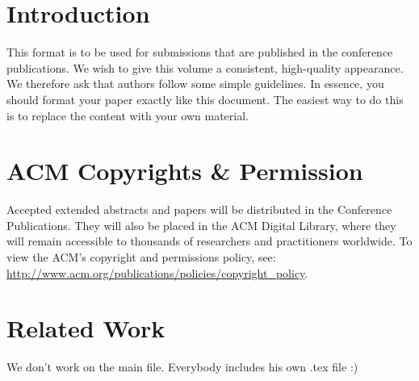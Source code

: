 \documentclass[sigchi-a, authorversion]{acmart}
\begin{document}


\section{Introduction}
This format is to be used for submissions that are published in the
conference publications. We wish to give this volume a consistent,
high-quality appearance. We therefore ask that authors follow some
simple guidelines. In essence, you should format your paper exactly
like this document. The easiest way to do this is to replace the
content with your own material.


\section{ACM Copyrights \& Permission}
Accepted extended abstracts and papers will be distributed in the
Conference Publications. They will also be placed in the ACM Digital
Library, where they will remain accessible to thousands of researchers
and practitioners worldwide. To view the ACM's copyright and
permissions policy, see:
\url{http://www.acm.org/publications/policies/copyright_policy}.


\section{Related Work}
We don't work on the main file. Everybody includes his own .tex file :)
\let\clearpage\relax
 
 









\end{document}
